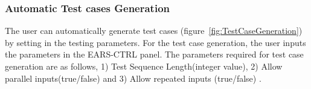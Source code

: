 \subsubsection{Automatic Test cases Generation} 
\vspace{-.5cm}
The user can automatically generate test cases
(figure~\ref{fig:TestCaseGeneration}) by setting in the testing parameters.
For the test case generation, the user inputs the
parameters in the \textsf{EARS-CTRL} panel.
The parameters required for test case generation are as follows, 1) \textsf{Test
Sequence Length(integer value)}, 2) \textsf{Allow parallel inputs(true/false)} and 3) \textsf{Allow repeated inputs (true/false)} .
